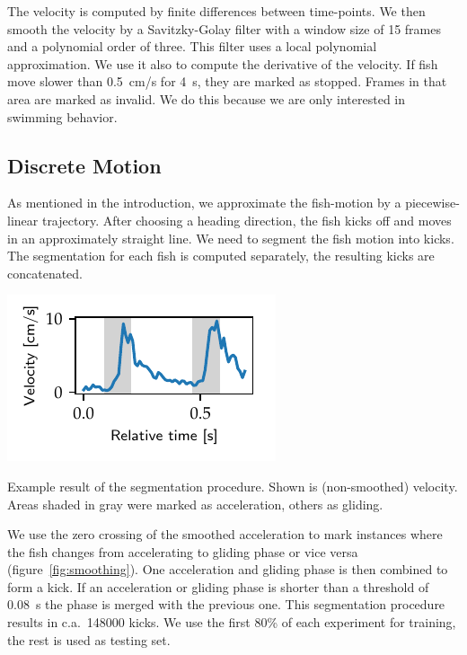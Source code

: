 \documentclass[nobib, a4paper]{tufte-handout}
\begin{document}
The velocity is computed by finite differences between time-points.
We then smooth the velocity by a Savitzky-Golay filter with a window size of 15 frames and a polynomial order of three.
This filter uses a local polynomial approximation.
We use it also to compute the derivative of the velocity.
If fish move slower than \SI{0.5}{\cm/\s} for \SI{4}{\s}, they are marked as stopped.
Frames in that area are marked as invalid.
We do this because we are only interested in swimming behavior.

\subsection{Discrete Motion}
As mentioned in the introduction, we approximate the fish-motion by a piecewise-linear trajectory.
After choosing a heading direction, the fish kicks off and moves in an approximately straight line.
We need to segment the fish motion into kicks.
The segmentation for each fish is computed separately, the resulting kicks are concatenated.

\begin{marginfigure}
\includegraphics[scale=1]{smoothing}
\caption{Example result of the segmentation procedure.
  Shown is (non-smoothed) velocity.
  Areas shaded in gray were marked as acceleration, others as gliding.
\label{fig:smoothing}}
\end{marginfigure}

We use the zero crossing of the smoothed acceleration to mark instances where the fish changes from accelerating to gliding phase or vice versa (figure~\ref{fig:smoothing}).
One acceleration and gliding phase is then combined to form a kick.
If an acceleration or gliding phase is shorter than a threshold of \SI{0.08}{\s} the phase is merged with the previous one.
This segmentation procedure results in c.a.\ 148000 kicks.
We use the first 80\% of each experiment for training, the rest is used as testing set.
\end{document}
